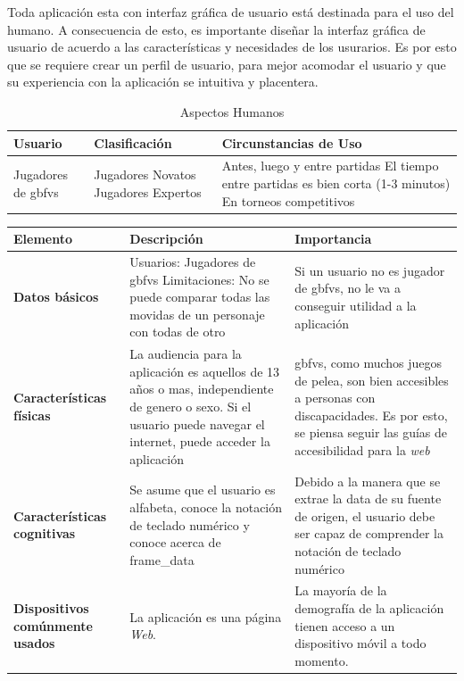 Toda aplicación esta con interfaz gráfica de usuario está destinada para el uso del humano. A consecuencia de esto, es importante diseñar la interfaz gráfica de usuario de acuerdo a las características y necesidades de los usurarios. Es por esto que se requiere crear un perfil de usuario, para mejor acomodar el usuario y que su experiencia con la aplicación se intuitiva y placentera.


\begin{table}[h!]
    \caption{Aspectos Humanos}
\begin{tabularx}{\textwidth}{| X | X | X |}
    \hline \textbf{Usuario} & \textbf{Clasificación} & \textbf{Circunstancias de Uso} \\
    \hline Jugadores de \gls{gbfvs} & Jugadores Novatos \newline Jugadores Expertos & Antes, luego y entre partidas \newline El tiempo entre partidas es bien corta (1-3 minutos) \newline  En torneos competitivos \\
    \hline
\end{tabularx}


\label{tab: aspectos humanos}
\end{table}


\begin{tabularx}{\textwidth}{| X | X | X |}
    \hline \textbf{Elemento} & \textbf{Descripción} & \textbf{Importancia} \\
    \hline \textbf{Datos básicos} & Usuarios: Jugadores de \gls{gbfvs} \newline Limitaciones: No se puede comparar todas las movidas de un personaje con todas de otro  & Si un usuario no es jugador de \gls{gbfvs}, no le va a conseguir utilidad a la aplicación\\
    \hline \textbf{Características físicas} & La audiencia para la aplicación es aquellos de 13 años o mas, independiente de genero o sexo. Si el usuario puede navegar el internet, puede acceder la aplicación & \gls{gbfvs}, como muchos juegos de pelea, son bien accesibles a personas con discapacidades. Es por esto, se piensa seguir las guías de accesibilidad para la \textit{web}\\ 
    \hline \textbf{Características cognitivas} & Se asume que el usuario es alfabeta, conoce la notación de teclado numérico \cite{noauthor_numpad_nodate} y conoce acerca de \gls{frame_data} & Debido a la manera que se extrae la data de su fuente de origen, el usuario debe ser capaz de comprender la notación de teclado numérico\\
    \hline \textbf{Dispositivos comúnmente usados} & La aplicación es una página \textit{Web}. 
    & La mayoría de la demografía de la aplicación tienen acceso a un dispositivo móvil a todo momento. \\
    
\end{tabularx}

